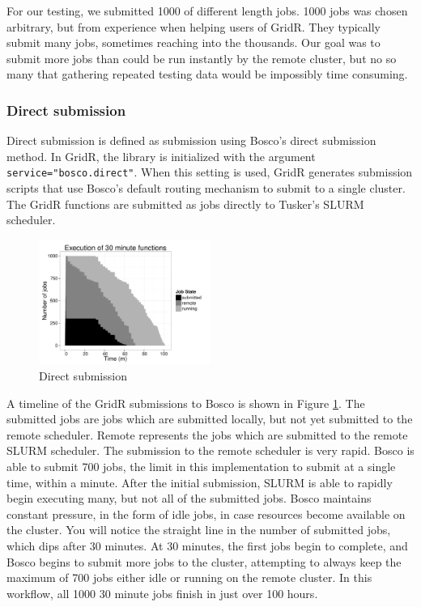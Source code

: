 \documentclass[conference]{IEEEtran}
\begin{document}
For our testing, we submitted 1000 of different length jobs. 1000 jobs was chosen arbitrary, but from experience when helping users of GridR.  They typically submit many jobs, sometimes reaching into the thousands.  Our goal was to submit more jobs than could be run instantly by the remote cluster, but no so many that gathering repeated testing data would be impossibly time consuming.

\subsubsection{Direct submission}
Direct submission is defined as submission using Bosco's direct submission method.  In GridR, the library is initialized with the argument \texttt{service="bosco.direct"}.  When this setting is used, GridR generates submission scripts that use Bosco's default routing mechanism to submit to a single cluster.  The GridR functions are submitted as jobs directly to Tusker's SLURM scheduler.

\begin{figure}[ht!]
\centering
\includegraphics[width=0.5\textwidth]{images/30minplot.pdf}

\caption{Direct submission}
\label{fig:directsubmit}
\end{figure}

A timeline of the GridR submissions to Bosco is shown in Figure \ref{fig:directsubmit}.  The submitted jobs are jobs which are submitted locally, but not yet submitted to the remote scheduler.  Remote represents the jobs which are submitted to the remote SLURM scheduler.  The submission to the remote scheduler is very rapid.  Bosco is able to submit 700 jobs, the limit in this implementation to submit at a single time, within a minute.  After the initial submission, SLURM is able to rapidly begin executing many, but not all of the submitted jobs.  Bosco maintains constant pressure, in the form of idle jobs, in case resources become available on the cluster.  You will notice the straight line in the number of submitted jobs, which dips after 30 minutes.  At 30 minutes, the first jobs begin to complete, and Bosco begins to submit more jobs to the cluster, attempting to always keep the maximum of 700 jobs either idle or running on the remote cluster.  In this workflow, all 1000 30 minute jobs finish in just over 100 hours.
\end{document}
